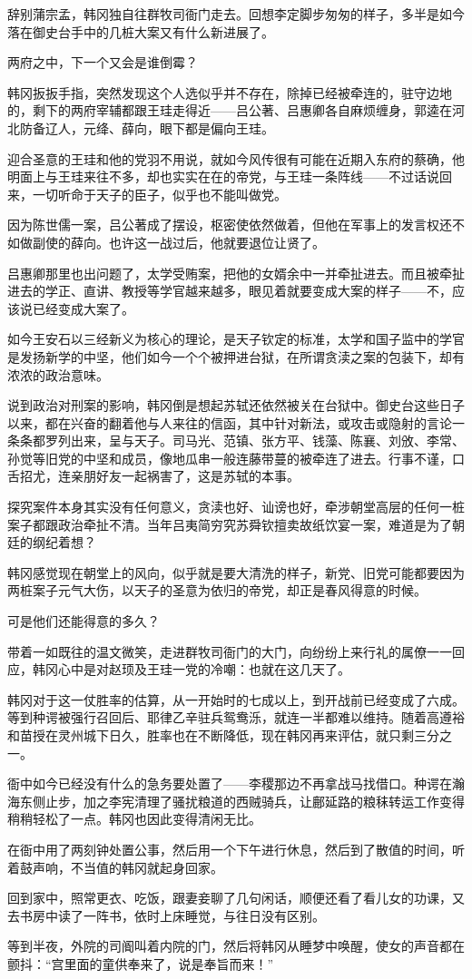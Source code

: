 辞别蒲宗孟，韩冈独自往群牧司衙门走去。回想李定脚步匆匆的样子，多半是如今落在御史台手中的几桩大案又有什么新进展了。

两府之中，下一个又会是谁倒霉？

韩冈扳扳手指，突然发现这个人选似乎并不存在，除掉已经被牵连的，驻守边地的，剩下的两府宰辅都跟王珪走得近——吕公著、吕惠卿各自麻烦缠身，郭逵在河北防备辽人，元绛、薛向，眼下都是偏向王珪。

迎合圣意的王珪和他的党羽不用说，就如今风传很有可能在近期入东府的蔡确，他明面上与王珪来往不多，却也实实在在的帝党，与王珪一条阵线——不过话说回来，一切听命于天子的臣子，似乎也不能叫做党。

因为陈世儒一案，吕公著成了摆设，枢密使依然做着，但他在军事上的发言权还不如做副使的薛向。也许这一战过后，他就要退位让贤了。

吕惠卿那里也出问题了，太学受贿案，把他的女婿余中一并牵扯进去。而且被牵扯进去的学正、直讲、教授等学官越来越多，眼见着就要变成大案的样子——不，应该说已经变成大案了。

如今王安石以三经新义为核心的理论，是天子钦定的标准，太学和国子监中的学官是发扬新学的中坚，他们如今一个个被押进台狱，在所谓贪渎之案的包装下，却有浓浓的政治意味。

说到政治对刑案的影响，韩冈倒是想起苏轼还依然被关在台狱中。御史台这些日子以来，都在兴奋的翻着他与人来往的信函，其中针对新法，或攻击或隐射的言论一条条都罗列出来，呈与天子。司马光、范镇、张方平、钱藻、陈襄、刘攽、李常、孙觉等旧党的中坚和成员，像地瓜串一般连藤带蔓的被牵连了进去。行事不谨，口舌招尤，连亲朋好友一起祸害了，这是苏轼的本事。

探究案件本身其实没有任何意义，贪渎也好、讪谤也好，牵涉朝堂高层的任何一桩案子都跟政治牵扯不清。当年吕夷简穷究苏舜钦擅卖故纸饮宴一案，难道是为了朝廷的纲纪着想？

韩冈感觉现在朝堂上的风向，似乎就是要大清洗的样子，新党、旧党可能都要因为两桩案子元气大伤，以天子的圣意为依归的帝党，却正是春风得意的时候。

可是他们还能得意的多久？

带着一如既往的温文微笑，走进群牧司衙门的大门，向纷纷上来行礼的属僚一一回应，韩冈心中是对赵顼及王珪一党的冷嘲：也就在这几天了。

韩冈对于这一仗胜率的估算，从一开始时的七成以上，到开战前已经变成了六成。等到种谔被强行召回后、耶律乙辛驻兵鸳鸯泺，就连一半都难以维持。随着高遵裕和苗授在灵州城下日久，胜率也在不断降低，现在韩冈再来评估，就只剩三分之一。

衙中如今已经没有什么的急务要处置了——李稷那边不再拿战马找借口。种谔在瀚海东侧止步，加之李宪清理了骚扰粮道的西贼骑兵，让鄜延路的粮秣转运工作变得稍稍轻松了一点。韩冈也因此变得清闲无比。

在衙中用了两刻钟处置公事，然后用一个下午进行休息，然后到了散值的时间，听着鼓声响，不当值的韩冈就起身回家。

回到家中，照常更衣、吃饭，跟妻妾聊了几句闲话，顺便还看了看儿女的功课，又去书房中读了一阵书，依时上床睡觉，与往日没有区别。

等到半夜，外院的司阍叫着内院的门，然后将韩冈从睡梦中唤醒，使女的声音都在颤抖：“宫里面的童供奉来了，说是奉旨而来！”

